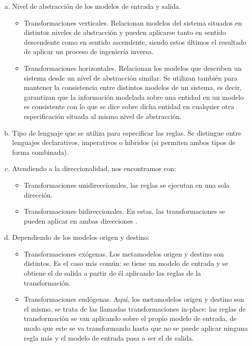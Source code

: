 {\begin{enumerate}[a)]
    \item Nivel de abstracción de los modelos de entrada y salida.
    \begin{itemize}
		\item Transformaciones verticales. Relacionan modelos del sistema situados en distintos niveles de abstracción y pueden aplicarse tanto en sentido descendente como en sentido ascendente, siendo estos últimos el resultado de aplicar un proceso de ingeniería inversa.
		\item Transformaciones horizontales. Relacionan los modelos que describen un sistema desde un nivel de abstracción similar. Se utilizan también para mantener la consistencia entre distintos modelos de un sistema, es decir, garantizan que la información modelada sobre una entidad en un modelo es consistente con lo que se dice sobre dicha entidad en cualquier otra especificación situada al mismo nivel de abstracción.
    \end{itemize}
    \item Tipo de lenguaje que se utiliza para especificar las reglas. Se distingue entre lenguajes declarativos, imperativos o híbridos (si permiten ambos tipos de forma combinada).
    \item Atendiendo a la direccionalidad, nos encontramos con:
    \begin{itemize}
    	\item Transformaciones unidireccionales, las reglas se ejecutan en una sola dirección.
    	\item Transformaciones bidireccionales. En estas, las transformaciones se pueden aplicar en ambas direcciones .
    \end{itemize}
    \item Dependiendo de los modelos origen y destino:
    \begin{itemize}
    	\item Transformaciones exógenas. Los metamodelos origen y destino son distintos. Es el caso más común: se tiene un modelo de entrada y se obtiene el de salida a partir de él aplicando las reglas de la transformación. 
    	\item Transformaciones endógenas. Aquí, los metamodelos origen y destino son el mismo, se trata de las llamadas transformaciones in-place: las reglas de transformación se van aplicando sobre el propio modelo de entrada, de modo que este se va transformando hasta que no se puede aplicar ninguna regla más y el modelo de entrada pasa a ser el de salida.

\end{itemize}
\end{enumerate}}
